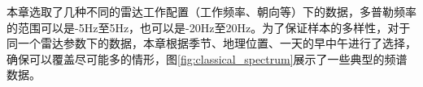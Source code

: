 本章选取了几种不同的雷达工作配置（工作频率、朝向等）下的数据，多普勒频率的范围可以是-5Hz至5Hz，也可以是-20Hz至20Hz。为了保证样本的多样性，对于同一个雷达参数下的数据，本章根据季节、地理位置、一天的早中午进行了选择，确保可以覆盖尽可能多的情形，图\ref{fig:classical_spectrum}展示了一些典型的频谱数据。
\begin{figure}[hbt]
	\centering
	\hfil

	\hfil


\end{figure}
